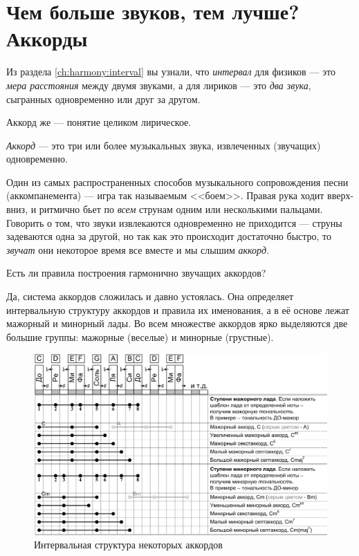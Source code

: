 \section{Чем больше звуков, тем лучше? Аккорды}
\label{ch:harmony:chords}

Из раздела \ref{ch:harmony:interval} вы узнали, что \emph{интервал} для физиков --- это \emph{мера расстояния} между двумя звуками, а для лириков --- это \emph{два звука}, сыгранных одновременно или друг за другом.

Аккорд же --- понятие целиком лирическое.

\begin{Definition}[Аккорд]
    \emph{Аккорд} --- это три или более музыкальных звука, извлеченных (звучащих) одновременно.
\end{Definition}

Один из самых распространенных способов музыкального сопровождения песни (аккомпанемента) --- игра так называемым <<боем>>. Правая рука ходит вверх-вниз, и ритмично бьет по \emph{всем} струнам одним или несколькими пальцами. Говорить о том, что звуки извлекаются одновременно не приходится --- струны задеваются одна за другой, но так как это происходит достаточно быстро, то \emph{звучат} они некоторое время все вместе и мы слышим \emph{аккорд}.

Есть ли правила построения гармонично звучащих аккордов?

Да, система аккордов сложилась и давно устоялась. Она определяет интервальную структуру аккордов и правила их именования, а в её основе лежат мажорный и минорный лады. Во всем множестве аккордов ярко выделяются две большие группы: мажорные (веселые) и минорные (грустные).

\begin{figure}[!ht]
    \centering
    \includegraphics[width=\textwidth]{fig/chords/structure} 
    \caption{Интервальная структура некоторых аккордов}\label{fig:harmony:chords:structure}
\end{figure} 

